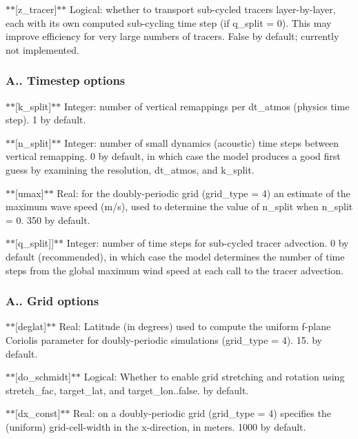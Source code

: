 $\ast$$\ast$\mbox{[}z\-\_\-tracer\mbox{]}$\ast$$\ast$ Logical\-: whether to transport sub-\/cycled tracers layer-\/by-\/layer, each with its own computed sub-\/cycling time step (if q\-\_\-split = 0). This may improve efficiency for very large numbers of tracers. False by default; currently not implemented.

\subsubsection*{A.. Timestep options}

$\ast$$\ast$\mbox{[}k\-\_\-split\mbox{]}$\ast$$\ast$ Integer\-: number of vertical remappings per dt\-\_\-atmos (physics time step). 1 by default.

$\ast$$\ast$\mbox{[}n\-\_\-split\mbox{]}$\ast$$\ast$ Integer\-: number of small dynamics (acoustic) time steps between vertical remapping. 0 by default, in which case the model produces a good first guess by examining the resolution, dt\-\_\-atmos, and k\-\_\-split.

$\ast$$\ast$\mbox{[}umax\mbox{]}$\ast$$\ast$ Real\-: for the doubly-\/periodic grid (grid\-\_\-type = 4) an estimate of the maximum wave speed (m/s), used to determine the value of n\-\_\-split when n\-\_\-split = 0. 350 by default.

$\ast$$\ast$\mbox{[}q\-\_\-split\mbox{]}\mbox{]}$\ast$$\ast$ Integer\-: number of time steps for sub-\/cycled tracer advection. 0 by default (recommended), in which case the model determines the number of time steps from the global maximum wind speed at each call to the tracer advection.

\subsubsection*{A.. Grid options}

$\ast$$\ast$\mbox{[}deglat\mbox{]}$\ast$$\ast$ Real\-: Latitude (in degrees) used to compute the uniform f-\/plane Coriolis parameter for doubly-\/periodic simulations (grid\-\_\-type = 4). 15. by default.

$\ast$$\ast$\mbox{[}do\-\_\-schmidt\mbox{]}$\ast$$\ast$ Logical\-: Whether to enable grid stretching and rotation using stretch\-\_\-fac, target\-\_\-lat, and target\-\_\-lon..false. by default.

$\ast$$\ast$\mbox{[}dx\-\_\-const\mbox{]}$\ast$$\ast$ Real\-: on a doubly-\/periodic grid (grid\-\_\-type = 4) specifies the (uniform) grid-\/cell-\/width in the x-\/direction, in meters. 1000 by default.

